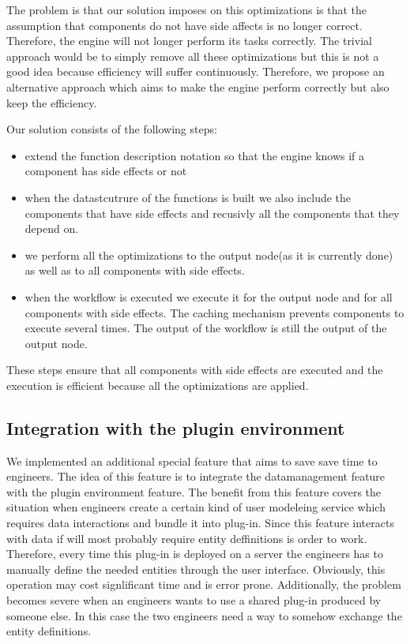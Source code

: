 \documentclass[a4paper, notitlepage]{article}
\begin{document}
The problem is that our solution imposes on this optimizations is that the assumption that components do not have side affects is no longer correct. Therefore, the engine will not longer perform its tasks correctly. The trivial approach would be to simply remove all these optimizations but this is not a good idea because efficiency will suffer continuously. Therefore, we propose an alternative approach which aims to make the engine perform correctly but also keep the efficiency.

Our solution consists of the following steps:
\begin{itemize}
	\item extend the function description notation so that the engine knows if a component has side effects or not
	\item when the datastcutrure of the functions is built we also include the components that have side effects and recusivly all the components that they depend on.
	\item we perform all the optimizations to the output node(as it is currently done) as well as to all components with side effects. 
	\item when the workflow is executed we execute it for the output node and for all components with side effects. The caching mechanism prevents components to execute several times. The output of the workflow is still the output of the output node.
\end{itemize}

These steps ensure that all components with side effects are executed and the execution is efficient because all the optimizations are applied.

\subsection{Integration with the plugin environment}

We implemented an additional special feature that aims to save save time to engineers. The idea of this feature is to integrate the datamanagement feature with the plugin environment feature. The benefit from this feature covers the situation when engineers create a certain kind of user modeleing service which requires data interactions and  bundle it into plug-in. Since this feature interacts with data if will most probably require entity deffinitions is order to work. Therefore, every time this plug-in is deployed on a server the engineers has to manually define the needed entities through the user interface. Obviously, this operation may cost signlificant time and is error prone. Additionally, the problem becomes severe when an engineers wants to use a shared plug-in produced by someone else. In this case the two engineers need a way to somehow exchange the entity definitions.
\end{document}
